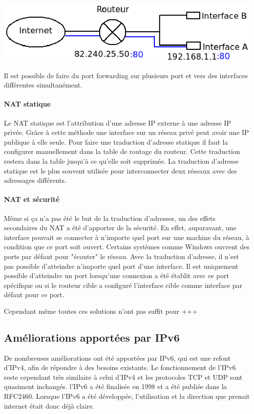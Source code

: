 \includegraphics{./pics/port_forwarding.eps}

Il est possible de faire du port forwarding sur plusieurs port et vers des
interfaces différentes simultanément.

\paragraph{NAT statique}
Le NAT statique est l'attribution d'une adresse IP externe à une adresse IP 
privée. Grâce à cette méthode une interface sur un réseau privé peut avoir une
IP publique à elle seule. Pour faire une traduction d'adresse statique il faut la configurer
manuellement dans la table de routage du routeur. Cette traduction restera dans
la table jusqu'à ce qu'elle soit supprimée. La traduction d'adresse statique
est le plus souvent utilisée pour interconnecter deux réseaux avec des
adressages différents.

\paragraph{NAT et sécurité}

Même si ça n'a pas été le but de la traduction d'adresses, un des effets
secondaires du NAT a été d'apporter de la sécurité. En effet, auparavant, une
interface pouvait se connecter à n'importe quel port sur une machine du réseau,
à condition que ce port soit ouvert. Certains systèmes comme Windows ouvrent des ports
par défaut pour "écouter" le réseau. Avec la traduction d'adresse, il n'est pas
possible d'atteindre n'importe quel port d'une interface. Il est uniquement
possible d'atteindre un port lorsqu'une connexion a été établit avec ce port
spécifique ou si le routeur cible a configuré l'interface cible comme interface
par défaut pour ce port.


Cependant même toutes ces solutions n'ont pas suffit pour +++

\subsection{Améliorations apportées par IPv6}

De nombreuses améliorations ont été apportées par IPv6, qui est une refont d'IPv4, afin de répondre à des besoins existants. Le fonctionnement de l'IPv6 reste cependant très similaire à celui d'IPv4 et 
les protocoles TCP et UDP sont quasiment inchangés.
l'IPv6 a été finalisée en 1998 et a été publiée dans la RFC2460. Lorsque l'IPv6 a été développée, 
l'utilisation et la direction que prenait internet était donc déjà claire. 

